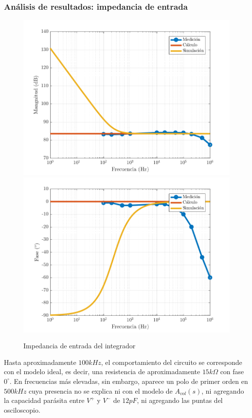 \documentclass[../../main.tex]{subfiles}
\begin{document}
\subsubsection{An\'alisis de resultados: impedancia de entrada}

\begin{figure}  [H]
	\centering
	\label{fig:i-zin}
	\includegraphics[scale=0.7]{fotos/tc_tp2_ej4_i_zin_mag.png}
	\includegraphics[scale=0.7]{fotos/tc_tp2_ej4_i_zin_fase.png}
	\caption{Impedancia de entrada del integrador}
\end{figure}

Hasta aproximadamente $100kHz$, el comportamiento del circuito se corresponde con el modelo ideal, es decir, una resistencia de aproximadamente $15k\Omega$ con fase $0^\circ$. En frecuencias m\'as elevadas, sin embargo, aparece un polo de primer orden en $500kHz$ cuya presencia no se explica ni con el modelo de $A_{vol}(s)$, ni agregando la capacidad par\'asita entre $V^+$ y $V^-$ de $12pF$, ni agregando las puntas del osciloscopio.
\end{document}
